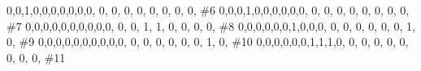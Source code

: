 \documentclass[
  letterpaper,
  DIV=11,
  numbers=noendperiod]{scrreprt}
\newenvironment{Shaded}{\begin{snugshade}}{\end{snugshade}}
\newcommand{\CommentTok}[1]{\textcolor[rgb]{0.37,0.37,0.37}{#1}}
\newcommand{\DecValTok}[1]{\textcolor[rgb]{0.68,0.00,0.00}{#1}}
\newcommand{\NormalTok}[1]{\textcolor[rgb]{0.00,0.23,0.31}{#1}}
\begin{document}
\begin{Shaded}
\begin{Highlighting}[]
               \DecValTok{0}\NormalTok{,}\DecValTok{0}\NormalTok{,}\DecValTok{1}\NormalTok{,}\DecValTok{0}\NormalTok{,}\DecValTok{0}\NormalTok{,}\DecValTok{0}\NormalTok{,}\DecValTok{0}\NormalTok{,}\DecValTok{0}\NormalTok{,}\DecValTok{0}\NormalTok{,}\DecValTok{0}\NormalTok{, }\DecValTok{0}\NormalTok{, }\DecValTok{0}\NormalTok{, }\DecValTok{0}\NormalTok{, }\DecValTok{0}\NormalTok{, }\DecValTok{0}\NormalTok{, }\DecValTok{0}\NormalTok{, }\DecValTok{0}\NormalTok{, }\DecValTok{0}\NormalTok{, }\CommentTok{\#6}
               \DecValTok{0}\NormalTok{,}\DecValTok{0}\NormalTok{,}\DecValTok{0}\NormalTok{,}\DecValTok{1}\NormalTok{,}\DecValTok{0}\NormalTok{,}\DecValTok{0}\NormalTok{,}\DecValTok{0}\NormalTok{,}\DecValTok{0}\NormalTok{,}\DecValTok{0}\NormalTok{,}\DecValTok{0}\NormalTok{, }\DecValTok{0}\NormalTok{, }\DecValTok{0}\NormalTok{, }\DecValTok{0}\NormalTok{, }\DecValTok{0}\NormalTok{, }\DecValTok{0}\NormalTok{, }\DecValTok{0}\NormalTok{, }\DecValTok{0}\NormalTok{, }\DecValTok{0}\NormalTok{, }\CommentTok{\#7}
               \DecValTok{0}\NormalTok{,}\DecValTok{0}\NormalTok{,}\DecValTok{0}\NormalTok{,}\DecValTok{0}\NormalTok{,}\DecValTok{0}\NormalTok{,}\DecValTok{0}\NormalTok{,}\DecValTok{0}\NormalTok{,}\DecValTok{0}\NormalTok{,}\DecValTok{0}\NormalTok{,}\DecValTok{0}\NormalTok{, }\DecValTok{0}\NormalTok{, }\DecValTok{0}\NormalTok{, }\DecValTok{1}\NormalTok{, }\DecValTok{1}\NormalTok{, }\DecValTok{0}\NormalTok{, }\DecValTok{0}\NormalTok{, }\DecValTok{0}\NormalTok{, }\DecValTok{0}\NormalTok{, }\CommentTok{\#8}
               \DecValTok{0}\NormalTok{,}\DecValTok{0}\NormalTok{,}\DecValTok{0}\NormalTok{,}\DecValTok{0}\NormalTok{,}\DecValTok{0}\NormalTok{,}\DecValTok{0}\NormalTok{,}\DecValTok{1}\NormalTok{,}\DecValTok{0}\NormalTok{,}\DecValTok{0}\NormalTok{,}\DecValTok{0}\NormalTok{, }\DecValTok{0}\NormalTok{, }\DecValTok{0}\NormalTok{, }\DecValTok{0}\NormalTok{, }\DecValTok{0}\NormalTok{, }\DecValTok{0}\NormalTok{, }\DecValTok{0}\NormalTok{, }\DecValTok{1}\NormalTok{, }\DecValTok{0}\NormalTok{, }\CommentTok{\#9}
               \DecValTok{0}\NormalTok{,}\DecValTok{0}\NormalTok{,}\DecValTok{0}\NormalTok{,}\DecValTok{0}\NormalTok{,}\DecValTok{0}\NormalTok{,}\DecValTok{0}\NormalTok{,}\DecValTok{0}\NormalTok{,}\DecValTok{0}\NormalTok{,}\DecValTok{0}\NormalTok{,}\DecValTok{0}\NormalTok{, }\DecValTok{0}\NormalTok{, }\DecValTok{0}\NormalTok{, }\DecValTok{0}\NormalTok{, }\DecValTok{0}\NormalTok{, }\DecValTok{0}\NormalTok{, }\DecValTok{0}\NormalTok{, }\DecValTok{1}\NormalTok{, }\DecValTok{0}\NormalTok{, }\CommentTok{\#10}
               \DecValTok{0}\NormalTok{,}\DecValTok{0}\NormalTok{,}\DecValTok{0}\NormalTok{,}\DecValTok{0}\NormalTok{,}\DecValTok{0}\NormalTok{,}\DecValTok{0}\NormalTok{,}\DecValTok{1}\NormalTok{,}\DecValTok{1}\NormalTok{,}\DecValTok{1}\NormalTok{,}\DecValTok{0}\NormalTok{, }\DecValTok{0}\NormalTok{, }\DecValTok{0}\NormalTok{, }\DecValTok{0}\NormalTok{, }\DecValTok{0}\NormalTok{, }\DecValTok{0}\NormalTok{, }\DecValTok{0}\NormalTok{, }\DecValTok{0}\NormalTok{, }\DecValTok{0}\NormalTok{, }\CommentTok{\#11 }

\end{Highlighting}
\end{Shaded}
\end{document}
